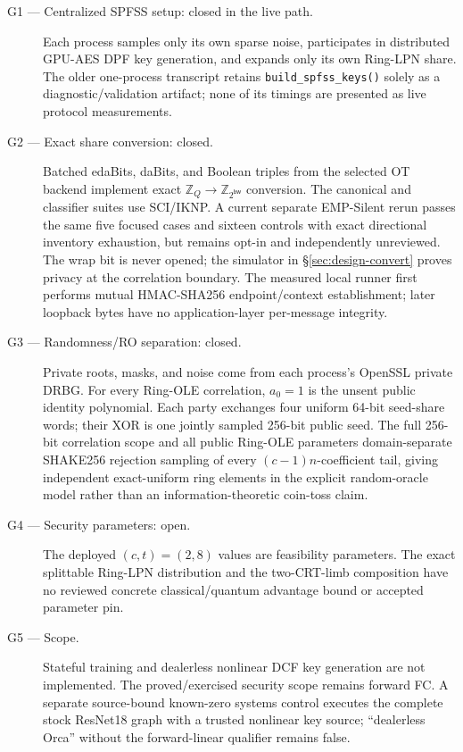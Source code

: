 \documentclass[11pt]{article}
\newcommand{\Z}{\mathbb{Z}}
\newcommand{\bw}{\mathsf{bw}}
\begin{document}
\begin{description}
\item[G1 --- Centralized SPFSS setup: closed in the live path.] Each process
  samples only its own sparse noise, participates in distributed GPU-AES DPF
  key generation, and expands only its own Ring-LPN share. The older
  one-process transcript retains \texttt{build\_spfss\_keys()} solely as a
  diagnostic/validation artifact; none of its timings are presented as live
  protocol measurements.
\item[G2 --- Exact share conversion: closed.]
  Batched edaBits, daBits, and Boolean triples from the selected OT backend
  implement exact $\Z_Q\to\Z_{2^\bw}$ conversion. The canonical and classifier
  suites use SCI/IKNP. A current separate EMP-Silent rerun passes the same five
  focused cases and sixteen controls with exact directional inventory
  exhaustion, but remains opt-in and independently unreviewed. The wrap bit is
  never opened; the simulator in \S\ref{sec:design-convert} proves privacy at
  the correlation boundary. The measured local runner first performs mutual
  HMAC-SHA256 endpoint/context establishment; later loopback bytes have no
  application-layer per-message integrity.
\item[G3 --- Randomness/RO separation: closed.]
  Private roots, masks, and noise come from each process's OpenSSL private
  DRBG. For every Ring-OLE correlation, $a_0=1$ is the unsent public identity
  polynomial. Each party exchanges four uniform 64-bit seed-share words; their
  XOR is one jointly sampled 256-bit public seed. The full 256-bit correlation
  scope and all public Ring-OLE parameters domain-separate SHAKE256 rejection
  sampling of every $(c-1)n$-coefficient tail, giving independent exact-uniform
  ring elements in the explicit random-oracle model rather than an
  information-theoretic coin-toss claim.
\item[G4 --- Security parameters: open.] The deployed $(c,t)=(2,8)$ values are
  feasibility parameters. The exact splittable Ring-LPN distribution and the
  two-CRT-limb composition have no reviewed concrete classical/quantum
  advantage bound or accepted parameter pin.
\item[G5 --- Scope.] Stateful training and dealerless nonlinear DCF key
  generation are not implemented. The proved/exercised security scope remains
  forward FC. A separate source-bound known-zero systems control executes the
  complete stock ResNet18 graph with a trusted nonlinear key source;
  ``dealerless Orca'' without the forward-linear qualifier remains false.
\end{description}
\end{document}
